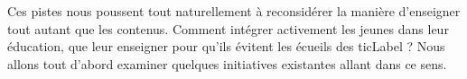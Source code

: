 Ces pistes nous poussent tout naturellement à reconsidérer la manière d'enseigner tout autant que les contenus. Comment intégrer activement les jeunes dans leur éducation, que leur enseigner pour qu'ils évitent les écueils des \gls{ticLabel} ?
Nous allons tout d'abord examiner quelques initiatives existantes allant dans ce sens.

